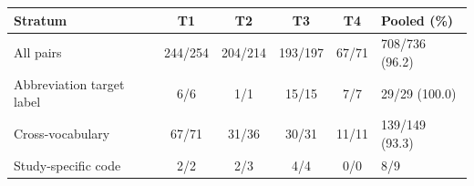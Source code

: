 \begin{tabular}{lccccl}
\toprule
\textbf{Stratum} & \textbf{T1} & \textbf{T2} & \textbf{T3} & \textbf{T4} & \textbf{Pooled (\%)} \\
\midrule
All pairs & 244/254 & 204/214 & 193/197 & 67/71 & 708/736 (96.2) \\
Abbreviation target label & 6/6 & 1/1 & 15/15 & 7/7 & 29/29 (100.0) \\
Cross-vocabulary & 67/71 & 31/36 & 30/31 & 11/11 & 139/149 (93.3) \\
Study-specific code & 2/2 & 2/3 & 4/4 & 0/0 & 8/9 \\
\bottomrule
\end{tabular}
